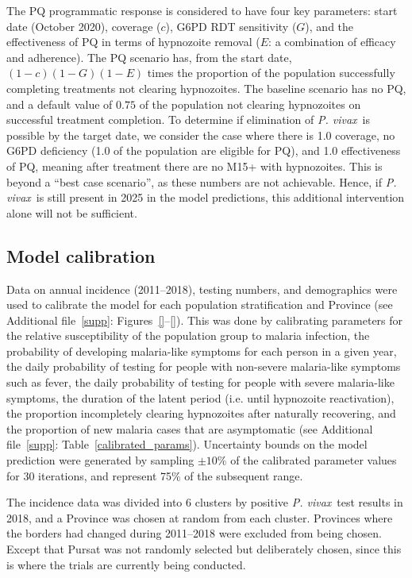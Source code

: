 \documentclass[doublespacing]{bmcart}
\newcommand{\pv}{\textit{P. vivax}}
\begin{document}
The PQ programmatic response is considered to have four key parameters: start date (October 2020), coverage ($c$), G6PD RDT sensitivity ($G$), and the effectiveness of PQ in terms of hypnozoite removal ($E$: a combination of efficacy and adherence). The PQ scenario has, from the start date, $(1-c)(1-G)(1-E)$ times the proportion of the population successfully completing treatments not clearing hypnozoites. The baseline scenario has no PQ, and a default value of $0.75$ of the population not clearing hypnozoites on successful treatment completion. To determine if elimination of \pv~is possible by the target date, we consider the case where there is 1.0 coverage, no G6PD deficiency (1.0 of the population are eligible for PQ), and 1.0 effectiveness of PQ, meaning after treatment there are no M15+ with hypnozoites. This is beyond a ``best case scenario'', as these numbers are not achievable. Hence, if \pv~is still present in 2025 in the model predictions, this additional intervention alone will not be sufficient.  

\subsection*{Model calibration} \label{sec:calibration} %

Data on annual incidence (2011--2018), testing numbers, and demographics were used to calibrate the model for each population stratification and Province (see Additional file~\ref{supp}: Figures~\ref{}--\ref{}). This was done by calibrating parameters for the relative susceptibility of the population group to malaria infection, the probability of developing malaria-like symptoms for each person in a given year, the daily probability of testing for people with non-severe malaria-like symptoms such as fever, the daily probability of testing for people with severe malaria-like symptoms, the duration of the latent period (i.e. until hypnozoite reactivation), the proportion incompletely clearing hypnozoites after naturally recovering, and the proportion of new malaria cases that are asymptomatic (see Additional file~\ref{supp}: Table~\ref{calibrated_params}). Uncertainty bounds on the model prediction were generated by sampling $\pm10\%$ of the calibrated parameter values for 30 iterations, and represent 75\% of the subsequent range.

The incidence data was divided into 6 clusters by positive \pv~test results in 2018, and a Province was chosen at random from each cluster. Provinces where the borders had changed during 2011--2018 were excluded from being chosen. Except that Pursat was not randomly selected but deliberately chosen, since this is where the trials are currently being conducted. 
\end{document}
